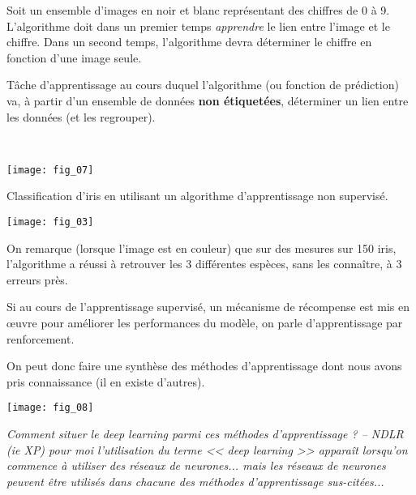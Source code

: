 \begin{exemple}
Soit un ensemble d'images en noir et blanc représentant des chiffres de 0 à 9. L'algorithme doit dans un premier temps \textit{apprendre} le lien entre l'image et le chiffre. 
Dans un second temps, l'algorithme devra déterminer le chiffre en fonction d'une image seule.
\end{exemple}

\begin{defi}
Tâche d'apprentissage au cours duquel l'algorithme (ou fonction de prédiction) va, à partir d'un ensemble de données \textbf{non étiquetées}, déterminer un lien entre les données (et les regrouper). 
\end{defi}



\begin{exemple} ~\\


\begin{center}
\texttt{[image: fig\_07]}
\end{center}


Classification d'iris en utilisant un algorithme d'apprentissage non supervisé.
\begin{center}
\texttt{[image: fig\_03]}
\end{center}

On remarque (lorsque l'image est en couleur) que sur des mesures sur 150 iris, l'algorithme a réussi à retrouver les 3 différentes espèces, sans les connaître, à 3 erreurs près.

\end{exemple}


\begin{defi}
Si au cours de l'apprentissage supervisé, un mécanisme de récompense est mis en \oe{}uvre pour améliorer les performances du modèle, on parle d'apprentissage par renforcement.
\end{defi}



On peut donc faire une synthèse des méthodes d'apprentissage dont nous avons pris connaissance (il en existe d'autres).

\begin{center}
\texttt{[image: fig\_08]}
\end{center}

\textit{Comment situer le deep learning parmi ces méthodes d'apprentissage ? -- NDLR (ie XP) pour moi l'utilisation du terme << deep learning >> apparaît lorsqu'on commence à utiliser des réseaux de neurones... mais les réseaux de neurones peuvent être utilisés dans chacune des méthodes d'apprentissage sus-citées...}


